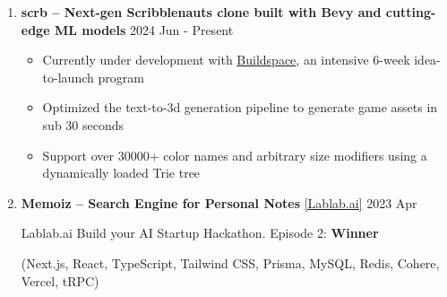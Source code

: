 \documentclass[
  a4paper,
  10pt,
  dvipdfmx
]{article}
\begin{document}
\begin{enumerate}[]
  \item \textbf{scrb -- Next-gen Scribblenauts clone built with Bevy and cutting-edge ML models} \hfill 2024 Jun - Present

        \begin{itemize}
          \item Currently under development with \href{https://buildspace.so/}{Buildspace}, an intensive 6-week idea-to-launch program
          \item Optimized the text-to-3d generation pipeline to generate game assets in sub 30 seconds
          \item Support over 30000+ color names and arbitrary size modifiers using a dynamically loaded Trie tree
        \end{itemize}



  \item \textbf{Memoiz -- Search Engine for Personal Notes} \href{https://lablab.ai/event/ai-startup-hackathon-episode-2/we-absolutely-have-no-idea/memoiz}{[Lablab.ai]} \hfill 2023 Apr

        Lablab.ai Build your AI Startup Hackathon. Episode 2: \textbf{Winner}

        (Next.js, React, TypeScript, Tailwind CSS, Prisma, MySQL, Redis, Cohere, Vercel, tRPC)


\end{enumerate}
\end{document}
